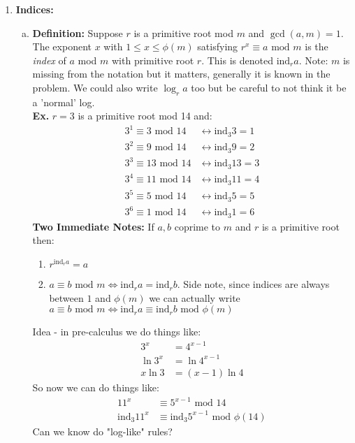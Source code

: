 \documentclass[class=article, crop=false]{standalone}
\begin{document}
\begin{enumerate}[1.]
\item \textbf{Indices:}
\begin{enumerate}[(a)]
	\item \textbf{Definition:} Suppose $r$ is a primitive root mod $m$ and $\gcd(a,m)=1$.
	The exponent $x$ with $1\leq x\leq \phi(m)$ satisfying
	$r^x\equiv a\mbox{ mod }m$ is the \textit{index} of $a$ mod $m$ with primitive root $r$.
	This is denoted $\mbox{ind}_r a$. Note: $m$ is missing from the notation but it matters,
	generally it is known in the problem. We could also write $\log_r a$ too but be careful to
	not think it be a 'normal' log. \\
	\textbf{Ex.} $r=3$ is a primitive root mod 14 and:
	\begin{align*}
		3^1 \equiv 3\mbox{ mod }14 &\leftrightarrow \mbox{ind}_{3} 3 = 1 \\ 
		3^2 \equiv 9\mbox{ mod }14 &\leftrightarrow \mbox{ind}_{3} 9 = 2 \\
		3^3 \equiv 13\mbox{ mod }14 &\leftrightarrow \mbox{ind}_{3} 13 = 3 \\
		3^4 \equiv 11\mbox{ mod }14 &\leftrightarrow \mbox{ind}_{3} 11 = 4 \\
		3^5 \equiv 5\mbox{ mod }14 &\leftrightarrow \mbox{ind}_{3} 5 = 5 \\
		3^6 \equiv 1\mbox{ mod }14 &\leftrightarrow \mbox{ind}_{3} 1 = 6
	\end{align*}
	\textbf{Two Immediate Notes:} If $a,b$ coprime to $m$ and $r$ is a primitive root then:
	\begin{enumerate}
		\item $r^{\mbox{ind}_r a}=a$
		\item $a\equiv b\mbox{ mod }m \iff \mbox{ind}_r a = \mbox{ind}_r b$.
		Side note, since indices are always between $1$ and $\phi(m)$ we can actually write
		$a\equiv b\mbox{ mod }m \iff \mbox{ind}_r a \equiv \mbox{ind}_r b\mbox{ mod }\phi(m)$
	\end{enumerate}
	Idea - in pre-calculus we do things like:
	\begin{align*}
		3^x &= 4^{x-1} \\
		\ln 3^x &= \ln 4^{x-1} \\
		x\ln 3 &= (x-1)\ln 4
	\end{align*}
	So now we can do things like:
	\begin{align*}
		11^x &\equiv 5^{x-1} \mbox{ mod }14 \\
		\mbox{ind}_{3} 11^x &\equiv \mbox{ind}_3 5^{x-1} \mbox{ mod }\phi(14)
	\end{align*}
	Can we know do "log-like" rules?


\end{enumerate}
\end{enumerate}
\end{document}

